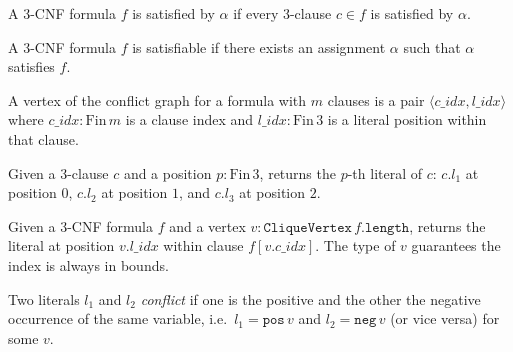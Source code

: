 \begin{definition}
\label{ThreeSATToClique.formula3Satisfied}
\leanok
{}
A 3-CNF formula $f$ is satisfied by $\alpha$ if every 3-clause $c \in f$ is
satisfied by $\alpha$.
\end{definition}

\begin{definition}
\label{ThreeSATToClique.is3Satisfiable}
\leanok
{}
A 3-CNF formula $f$ is satisfiable if there exists an assignment $\alpha$ such
that $\alpha$ satisfies $f$.
\end{definition}

\begin{definition}
\label{ThreeSATToClique.CliqueVertex}
\leanok
A vertex of the conflict graph for a formula with $m$ clauses is a pair
$\langle c\_idx, l\_idx \rangle$ where $c\_idx : \mathrm{Fin}\,m$ is a clause index
and $l\_idx : \mathrm{Fin}\,3$ is a literal position within that clause.
\end{definition}

\begin{definition}
\label{ThreeSATToClique.getLitInClause}
\leanok
{}
Given a 3-clause $c$ and a position $p : \mathrm{Fin}\,3$, returns the $p$-th
literal of $c$: $c.l_1$ at position $0$, $c.l_2$ at position $1$, and $c.l_3$ at
position $2$.
\end{definition}

\begin{definition}
\label{ThreeSATToClique.getLitAt}
\leanok
{}
Given a 3-CNF formula $f$ and a vertex $v : \mathtt{CliqueVertex}\,f.\mathtt{length}$,
returns the literal at position $v.l\_idx$ within clause $f[v.c\_idx]$.  The type of
$v$ guarantees the index is always in bounds.
\end{definition}

\begin{definition}
\label{ThreeSATToClique.literalsConflict}
\leanok
{}
Two literals $l_1$ and $l_2$ \emph{conflict} if one is the positive and the other
the negative occurrence of the same variable, i.e.\ $l_1 = \texttt{pos}\,v$ and
$l_2 = \texttt{neg}\,v$ (or vice versa) for some $v$.
\end{definition}


